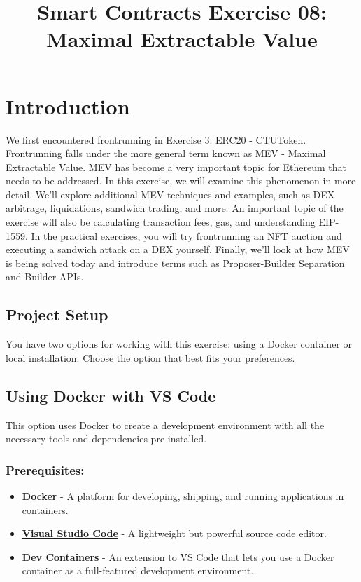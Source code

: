 \documentclass[12pt]{article}
\title{Smart Contracts Exercise 08: \\ Maximal Extractable Value}
\author{}
\date{}
\begin{document}
\maketitle
\section{Introduction}

We first encountered frontrunning in Exercise 3: ERC20 - CTUToken. Frontrunning falls under the more general term known as MEV - Maximal Extractable Value. MEV has become a very important topic for Ethereum that needs to be addressed. In this exercise, we will examine this phenomenon in more detail. We'll explore additional MEV techniques and examples, such as DEX arbitrage, liquidations, sandwich trading, and more. An important topic of the exercise will also be calculating transaction fees, gas, and understanding EIP-1559. In the practical exercises, you will try frontrunning an NFT auction and executing a sandwich attack on a DEX yourself. Finally, we'll look at how MEV is being solved today and introduce terms such as Proposer-Builder Separation and Builder APIs.

\subsection*{Project Setup}

You have two options for working with this exercise: using a Docker container or local installation. Choose the option that best fits your preferences.

\subsection{Using Docker with VS Code}

This option uses Docker to create a development environment with all the necessary tools and dependencies pre-installed.

\subsubsection*{Prerequisites:}

\begin{itemize}
    \item \textbf{\href{https://www.docker.com/products/docker-desktop}{Docker}} - A platform for developing, shipping, and running applications in containers.
    \item \textbf{\href{https://code.visualstudio.com/}{Visual Studio Code}} - A lightweight but powerful source code editor.
    \item \textbf{\href{https://marketplace.visualstudio.com/items?itemName=ms-vscode-remote.remote-containers}{Dev Containers}} - An extension to VS Code that lets you use a Docker container as a full-featured development environment.
\end{itemize}
\end{document}
